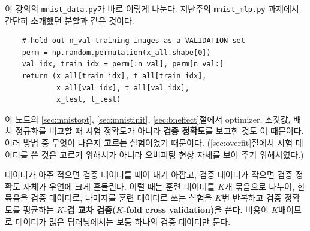 \documentclass[11pt,a4paper]{article}
\begin{document}
\begin{center}
\end{center}

이 강의의 \texttt{mnist\_data.py}가 바로 이렇게 나눈다.
지난주의 \texttt{mnist\_mlp.py} 과제에서 간단히 소개했던 분할과 같은 것이다.
\begin{lstlisting}
    # hold out n_val training images as a VALIDATION set
    perm = np.random.permutation(x_all.shape[0])
    val_idx, train_idx = perm[:n_val], perm[n_val:]
    return (x_all[train_idx], t_all[train_idx],
            x_all[val_idx], t_all[val_idx],
            x_test, t_test)
\end{lstlisting}
이 노트의 \ref{sec:mnistopt}, \ref{sec:mnistinit}, \ref{sec:bneffect}절에서 optimizer, 초깃값, 배치 정규화를 비교할 때
시험 정확도가 아니라 \textbf{검증 정확도}를 보고한 것도 이 때문이다.
여러 방법 중 무엇이 나은지 \textbf{고르는} 실험이었기 때문이다.
(\ref{sec:overfit}절에서 시험 데이터를 쓴 것은 고르기 위해서가 아니라 오버피팅 현상 자체를 보여 주기 위해서였다.)

\begin{remarkbox}[데이터가 적을 때: 교차 검증]
데이터가 아주 적으면 검증 데이터를 떼어 내기 아깝고, 검증 데이터가 작으면 검증 정확도 자체가 우연에 크게 흔들린다.
이럴 때는 훈련 데이터를 $K$개 묶음으로 나누어, 한 묶음을 검증 데이터로, 나머지를 훈련 데이터로 쓰는 실험을
$K$번 반복하고 검증 정확도를 평균하는 \textbf{$K$-겹 교차 검증($K$-fold cross validation)}을 쓴다.
비용이 $K$배이므로 데이터가 많은 딥러닝에서는 보통 하나의 검증 데이터만 둔다.
\end{remarkbox}
\end{document}
